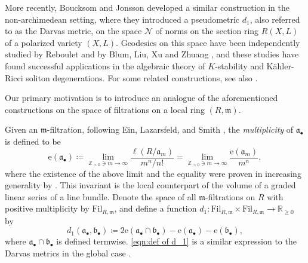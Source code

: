 \documentclass[11pt, leqno]{amsart}%
\theoremstyle{plain}
\theoremstyle{definition}
\theoremstyle{remark}
\newcommand{\cN}{\mathcal{N}}
\newcommand{\bR}{\mathbb{R}}
\newcommand{\bZ}{\mathbb{Z}}
\newcommand{\fa}{\mathfrak{a}}
\newcommand{\fb}{\mathfrak{b}}
\newcommand{\fm}{\mathfrak{m}}
\newcommand{\e}{\mathrm{e}}
\newcommand{\Fil}{\mathrm{Fil}}
\numberwithin{equation}{section}
\begin{document}
More recently, Boucksom and Jonsson \cites{BJ21} developed a similar construction in the non-archimedean setting, where they introduced a pseudometric $d_1$, also referred to as the Darvas metric, on the space $\cN$ of %
norms on the section ring $R(X,L)$ of a polarized variety $(X,L)$. Geodesics on this space have been independently studied by Reboulet \cite{Reb22} and by Blum, Liu, Xu and Zhuang \cites{BLXZ21}, and these studies have found successful applications in the algebraic theory of $K$-stability and  K\"ahler-Ricci soliton degenerations. For some related constructions, see also \cites{Reb20,Wu22,Fin23}.
	
Our primary motivation is to introduce an analogue of the aforementioned constructions on the space of %
filtrations on a local ring $(R,\fm)$. 
	
	
Given an $\fm$-filtration, following Ein, Lazarsfeld, and Smith \cite{ELS03}, the \emph{multiplicity} of $\fa_\bullet$ is defined to be
\[
    \e(\fa_\bullet)\coloneqq 
    \lim_{ \bZ_{>0} \ni m\to\infty}
    \frac{\ell(R/\fa_m)}{m^n/n!} 
    =\lim_{ \bZ_{>0} \ni m\to\infty} 
    \frac{\e(\fa_m)}{m^n} ,
\]
where the existence of the above limit and the equality were proven in increasing generality by \cites{ELS03,Mus02,LM09,Cut13,Cut14}. 
This invariant is the local counterpart of the volume of a graded linear series of a line bundle.
Denote the space of all $\fm$-filtrations on $R$ with positive multiplicity by $\Fil_{R,\fm}$, and define a function $d_1:\Fil_{R,\fm}\times\Fil_{R,\fm}\to\bR_{\ge 0}$ by    
\begin{equation}\label{eqn:def of d_1}
    d_1(\fa_\bullet,\fb_\bullet)\coloneqq
    2\e(\fa_\bullet\cap\fb_\bullet)-\e(\fa_\bullet)-\e(\fb_\bullet),
\end{equation}
where $\fa_\bullet\cap\fb_\bullet$ is defined termwise. \eqref{eqn:def of d_1} is a similar expression to the Darvas metrics in the global case \cites{Dar15,BJ21}.
\end{document}
